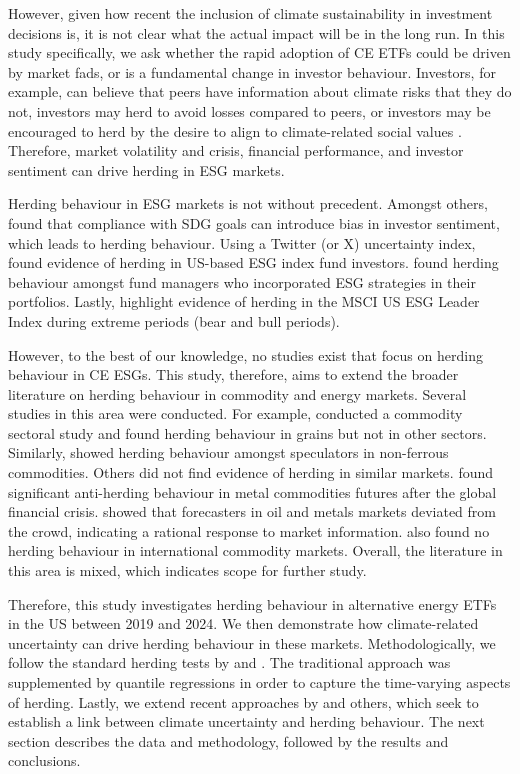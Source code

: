 \documentclass[
  letterpaper,
  DIV=11,
  numbers=noendperiod]{scrartcl}
\begin{document}
However, given how recent the inclusion of climate sustainability in
investment decisions is, it is not clear what the actual impact will be
in the long run. In this study specifically, we ask whether the rapid
adoption of CE ETFs could be driven by market fads, or is a fundamental
change in investor behaviour. Investors, for example, can believe that
peers have information about climate risks that they do not, investors
may herd to avoid losses compared to peers, or investors may be
encouraged to herd by the desire to align to climate-related social
values \citep{ciciretti2021, gavrilakis2023, loang2023}. Therefore,
market volatility and crisis, financial performance, and investor
sentiment can drive herding in ESG markets.

Herding behaviour in ESG markets is not without precedent. Amongst
others, \citet{loang2023} found that compliance with SDG goals can
introduce bias in investor sentiment, which leads to herding behaviour.
Using a Twitter (or X) uncertainty index, \citet{koutmos2024} found
evidence of herding in US-based ESG index fund investors.
\citet{przychodzen2016} found herding behaviour amongst fund managers
who incorporated ESG strategies in their portfolios. Lastly,
\citet{rubbaniy2021} highlight evidence of herding in the MSCI US ESG
Leader Index during extreme periods (bear and bull periods).

However, to the best of our knowledge, no studies exist that focus on
herding behaviour in CE ESGs. This study, therefore, aims to extend the
broader literature on herding behaviour in commodity and energy markets.
Several studies in this area were conducted. For example,
\citet{demirer2013a} conducted a commodity sectoral study and found
herding behaviour in grains but not in other sectors. Similarly,
\citet{gilbert2010} showed herding behaviour amongst speculators in
non-ferrous commodities. Others did not find evidence of herding in
similar markets. \citet{babalos2015} found significant anti-herding
behaviour in metal commodities futures after the global financial
crisis. \citet{pierdzioch2010} showed that forecasters in oil and metals
markets deviated from the crowd, indicating a rational response to
market information. \citet{steen2013} also found no herding behaviour in
international commodity markets. Overall, the literature in this area is
mixed, which indicates scope for further study.

Therefore, this study investigates herding behaviour in alternative
energy ETFs in the US between 2019 and 2024. We then demonstrate how
climate-related uncertainty can drive herding behaviour in these
markets. Methodologically, we follow the standard herding tests by
\citet{christie1995} and \citet{chang2000}. The traditional approach was
supplemented by quantile regressions \citep[ ]{koenker1978} in order to
capture the time-varying aspects of herding. Lastly, we extend recent
approaches by \citet{bua2024} and others, which seek to establish a link
between climate uncertainty and herding behaviour. The next section
describes the data and methodology, followed by the results and
conclusions.
\end{document}

